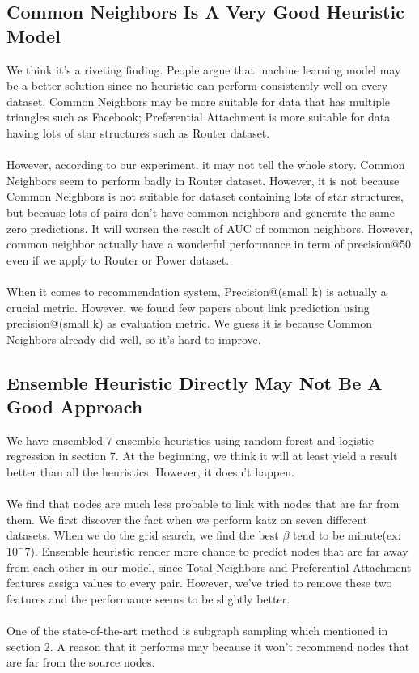 \documentclass[12pt]{article}
\begin{document}
\subsection{Common Neighbors Is A Very Good Heuristic Model}
We think it's a riveting finding. People argue that machine learning model may be a better solution since no heuristic can perform consistently well on every dataset. Common Neighbors may be more suitable for data that has multiple triangles such as Facebook; Preferential Attachment is more suitable for data having lots of star structures such as Router dataset. 
\\ \\
However, according to our experiment, it may not tell the whole story. Common Neighbors seem to perform badly in Router dataset. However, it is not because Common Neighbors is not suitable for dataset containing lots of star structures, but because lots of pairs don't have common neighbors and generate the same zero predictions. It will worsen the result of AUC of common neighbors. However, common neighbor actually have a wonderful performance in term of precision@50 even if we apply to Router or Power dataset.
\\ \\
When it comes to recommendation system, Precision@(small k) is actually a crucial metric. However, we found few papers about link prediction using precision@(small k) as evaluation metric. We guess it is because Common Neighbors already did well, so it's hard to improve. 

\subsection{Ensemble Heuristic Directly May Not Be A Good Approach}
We have ensembled 7 ensemble heuristics using random forest and logistic regression in section 7. At the beginning, we think it will at least yield a result better than all the heuristics. However, it doesn't happen. 
\\ \\
We find that nodes are much less probable to link with nodes that are far from them. We first discover the fact when we perform katz on seven different datasets. When we do the grid search, we find the best $\beta$ tend to be minute(ex: $10^-7$). Ensemble heuristic render more chance to predict nodes that are far away from each other in our model, since Total Neighbors and Preferential Attachment features assign values to every pair. However, we've tried to remove these two features and the performance seems to be slightly better.  
\\ \\
One of the state-of-the-art method is subgraph sampling which mentioned in section 2. A reason that it performs may because it won't recommend nodes that are far from the source nodes. 
\end{document}
